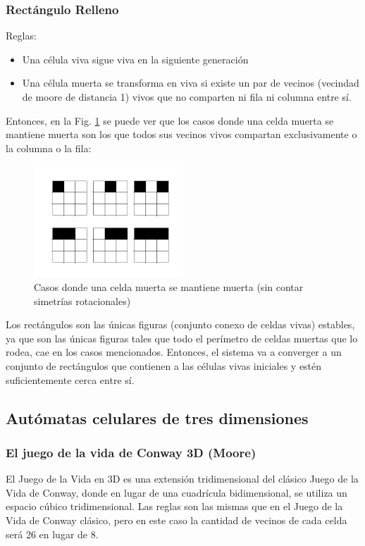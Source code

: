 \subsubsection{Rectángulo Relleno}
Reglas:
\begin{itemize}
    \item Una célula viva sigue viva en la siguiente generación
    \item Una célula muerta se transforma en viva si existe un par de vecinos (vecindad de moore de distancia 1) vivos que no comparten ni fila ni columna entre sí.
\end{itemize}
Entonces, en la Fig. \ref{fig:fill} se puede ver que los casos donde una celda muerta se mantiene muerta son los que todos sus vecinos vivos compartan exclusivamente o la columna o la fila:
\begin{figure}[H]
    \centering
    \includegraphics[width=0.5\textwidth]{Images/fill_example_1a}
    \caption{Casos donde una celda muerta se mantiene muerta (sin contar simetrías rotacionales)}
    \label{fig:fill}
\end{figure}
Los rectángulos son las únicas figuras (conjunto conexo de celdas vivas) estables, ya que son las únicas figuras tales que todo el perímetro de celdas muertas que lo rodea, cae en los casos mencionados.
Entonces, el sistema va a converger a un conjunto de rectángulos que contienen a las células vivas iniciales y estén suficientemente cerca entre sí.

\subsection{Autómatas celulares de tres dimensiones}
\label{subsec:3d}

\subsubsection{El juego de la vida de Conway 3D (Moore)}
El Juego de la Vida en 3D es una extensión tridimensional del clásico Juego de la Vida de Conway, donde en lugar de una cuadrícula bidimensional, se utiliza un espacio cúbico tridimensional.
Las reglas son las mismas que en el Juego de la Vida de Conway clásico, pero en este caso la cantidad de vecinos de cada celda será 26 en lugar de 8.

